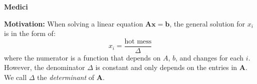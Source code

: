 \documentclass{article}
\newcommand{\bff}[1]{\mathbf{#1}}
\begin{document}
    \begin{minipage}[t]{.45\linewidth}
        \begin{center}
            \textbf{Medici}
        \end{center}
        \textbf{Motivation:} When solving a linear equation $\bff{Ax}=\bff{b}$, the general solution for $x_i$ is in the form of:
        \begin{equation*}
            x_i = \frac{\text{hot mess}}{\Delta}
        \end{equation*}
        where the numerator is a function that depends on $A$, $b$, and changes for each $i$. However, the denominator $\Delta$ is constant and only depends on the entries in $\bff{A}$. We call $\Delta$ the \textit{determinant} of $\bff{A}$.
        \vspace{2mm}


\end{minipage}
\end{document}
